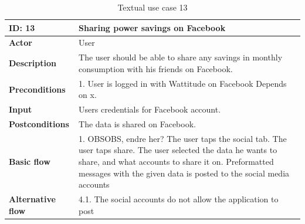 \begin{table}[H]
\begin{tabular}{|l|p{11.7cm}|}
\hline
\textbf{ID: }13&\textbf{Sharing power savings on Facebook}
\\\hline
\textbf{Actor} &User
\\\hline
\textbf{Description}&
The user should be able to share any savings in monthly consumption with his friends on Facebook.\\\hline
\textbf{Preconditions}&
1. User is logged in with Wattitude on Facebook\newline
Depends on x.\\\hline
\textbf{Input}&
Users credentials for Facebook account.\\\hline
\textbf{Postconditions}& 
The data is shared on Facebook. \\\hline
\textbf{Basic flow}&
1. OBSOBS, endre her? The user taps the social tab\newline
2. The user taps share\newline
3. The user selected the data he wants to share, and what accounts to share it on\newline
4. Preformatted messages with the given data is posted to the social media accounts
\\\hline
\textbf{Alternative flow}&
4.1. The social accounts do not allow the application to post
\\\hline
\end{tabular}
\caption{Textual use case 13}
\end{table}


